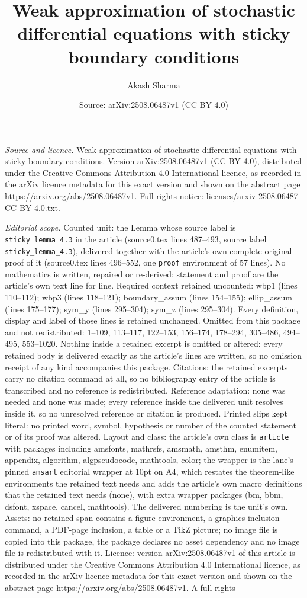 \documentclass[10pt,a4paper]{amsart}
\title[Weak approximation of stochastic differential equations with]{Weak approximation of stochastic differential equations with sticky boundary conditions}
\author{Akash Sharma}
\date{Source: arXiv:2508.06487v1 (CC BY 4.0)}
\begin{document}
\maketitle

\noindent\emph{Source and licence.} Weak approximation of stochastic differential equations with sticky boundary conditions. Version arXiv:2508.06487v1 (CC BY 4.0), distributed under the Creative Commons Attribution 4.0 International licence, as recorded in the arXiv licence metadata for this exact version and shown on the abstract page https://arxiv.org/abs/2508.06487v1. Full rights notice: licenses/arxiv-2508.06487-CC-BY-4.0.txt.\par\smallskip

\noindent\textit{Editorial scope.} Counted unit: the Lemma whose source label is \texttt{sticky\_lemma\_4.3} in the article (source0.tex lines 487--493, source label \texttt{sticky\_lemma\_4.3}), delivered together with the article's own complete original proof of it (source0.tex lines 496--552, one \texttt{proof} environment of 57 lines). No mathematics is written, repaired or re-derived: statement and proof are the article's own text line for line. Required context retained uncounted: wbp1 (lines 110--112); wbp3 (lines 118--121); boundary\_assum (lines 154--155); ellip\_assum (lines 175--177); sym\_y (lines 295--304); sym\_z (lines 295--304). Every definition, display and label of those lines is retained unchanged. Omitted from this package and not redistributed: 1--109, 113--117, 122--153, 156--174, 178--294, 305--486, 494--495, 553--1020. Nothing inside a retained excerpt is omitted or altered: every retained body is delivered exactly as the article's lines are written, so no omission receipt of any kind accompanies this package. Citations: the retained excerpts carry no citation command at all, so no bibliography entry of the article is transcribed and no reference is redistributed. Reference adaptation: none was needed and none was made; every reference inside the delivered unit resolves inside it, so no unresolved reference or citation is produced. Printed slips kept literal: no printed word, symbol, hypothesis or number of the counted statement or of its proof was altered. Layout and class: the article's own class is \texttt{article} with packages including amsfonts, mathrsfs, amsmath, amsthm, enumitem, appendix, algorithm, algpseudocode, mathtools, color; the wrapper is the lane's pinned \texttt{amsart} editorial wrapper at 10pt on A4, which restates the theorem-like environments the retained text needs and adds the article's own macro definitions that the retained text needs (none), with extra wrapper packages (bm, bbm, dsfont, xspace, cancel, mathtools). The delivered numbering is the unit's own. Assets: no retained span contains a figure environment, a graphics-inclusion command, a PDF-page inclusion, a table or a TikZ picture; no image file is copied into this package, the package declares no asset dependency and no image file is redistributed with it. Licence: version arXiv:2508.06487v1 of this article is distributed under the Creative Commons Attribution 4.0 International licence, as recorded in the arXiv licence metadata for this exact version and shown on the abstract page https://arxiv.org/abs/2508.06487v1. A full rights 
\end{document}
